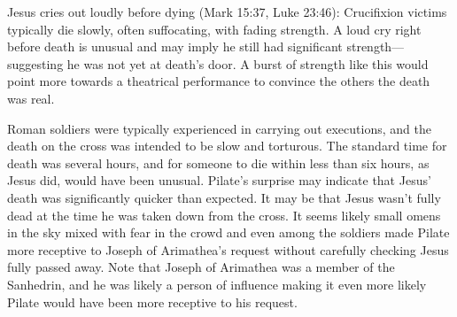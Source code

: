 Jesus cries out loudly before dying (Mark 15:37, Luke 23:46): Crucifixion victims typically die slowly, often suffocating, with fading strength.
A loud cry right before death is unusual and may imply he still had significant strength---suggesting he was not yet at death's door.
A burst of strength like this would point more towards a theatrical performance to convince the others the death was real.

Roman soldiers were typically experienced in carrying out executions, and the death on the cross was intended to be slow and torturous.
The standard time for death was several hours, and for someone to die within less than six hours, as Jesus did, would have been unusual.
Pilate's surprise may indicate that Jesus' death was significantly quicker than expected.
It may be that Jesus wasn't fully dead at the time he was taken down from the cross.
It seems likely small omens in the sky mixed with fear in the crowd and even among the soldiers made Pilate more receptive to Joseph of Arimathea's request without carefully checking Jesus fully passed away.
Note that Joseph of Arimathea was a member of the Sanhedrin, and he was likely a person of influence making it even more likely Pilate would have been more receptive to his request.

